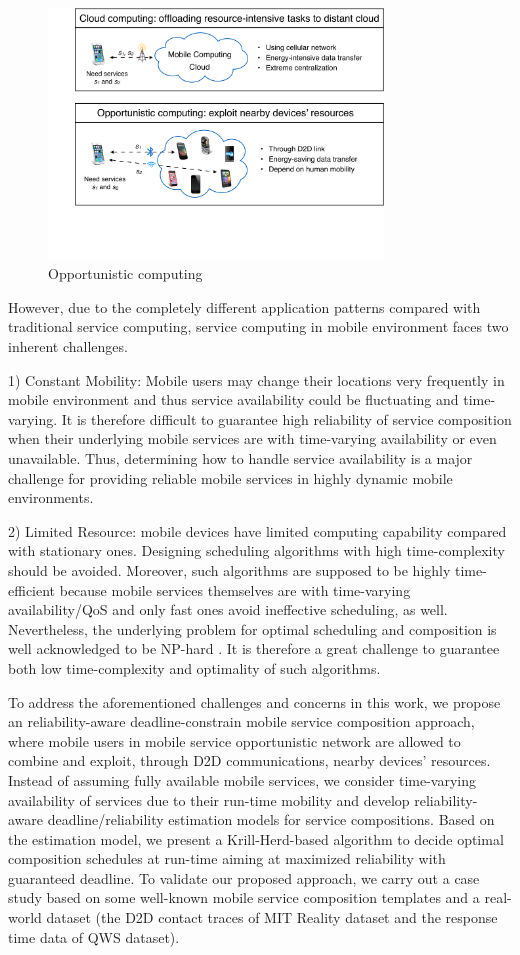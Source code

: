 \documentclass[journal]{IEEEtran}
\begin{document}
\begin{figure}[!t]
\centering
\includegraphics[width=3.5in]{./img/pic1.pdf}
\caption{Opportunistic computing}
\label{Opportunistic computing}
\end{figure}

However, due to the completely different application patterns compared with traditional service computing, service computing in mobile environment faces two inherent challenges.

1) Constant Mobility: Mobile users may change their locations very frequently in mobile environment and thus service availability could be fluctuating and time-varying. It is therefore difficult to guarantee high reliability of service composition when their underlying mobile services are with time-varying availability or even unavailable. Thus, determining how to handle service availability is a major challenge for providing reliable mobile services in highly dynamic mobile environments.

2) Limited Resource: mobile devices have limited computing capability compared with stationary ones. Designing scheduling algorithms with high time-complexity should be avoided.
Moreover, such algorithms are supposed to be highly time-efficient because mobile services themselves are with time-varying availability/QoS and only fast ones avoid ineffective scheduling, as well. 
Nevertheless, the underlying problem for optimal scheduling and composition is well acknowledged to be NP-hard . It is therefore a great challenge to guarantee both low time-complexity and optimality of such algorithms.

To address the aforementioned challenges and concerns in this work, we propose an reliability-aware deadline-constrain mobile service composition approach, where mobile users in mobile service opportunistic network are allowed to combine and exploit, through D2D communications, nearby devices' resources. Instead of assuming fully available mobile services, we consider time-varying availability of services due to their run-time mobility and develop reliability-aware deadline/reliability estimation models for service compositions. Based on the estimation model, we present a Krill-Herd-based algorithm to decide optimal composition schedules at run-time aiming at maximized reliability with guaranteed deadline. To validate our proposed approach, we carry out a case study based on some well-known mobile service composition templates and a real-world dataset (the D2D contact traces of MIT Reality dataset and the response time data of QWS dataset).
\end{document}
